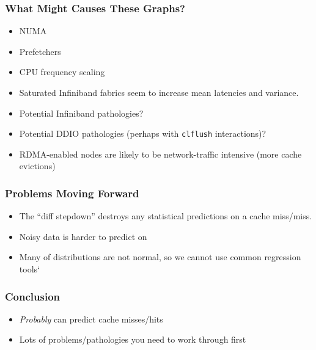 \documentclass{beamer}
\begin{document}
\begin{frame}
 \frametitle{What Might Causes These Graphs?}
 \begin{itemize}
  \item NUMA
  \item Prefetchers
  \item CPU frequency scaling
  \item Saturated Infiniband fabrics seem to increase mean latencies and variance.
  \item Potential Infiniband pathologies?
  \item Potential DDIO pathologies (perhaps with \texttt{clflush} interactions)?
  \item RDMA-enabled nodes are likely to be network-traffic intensive (more cache evictions)
 \end{itemize}
\end{frame}

\begin{frame}
 \frametitle{Problems Moving Forward}
 \begin{itemize}
  \item The ``diff stepdown'' destroys any statistical predictions on a cache miss/miss.
  \item Noisy data is harder to predict on
  \item Many of distributions are not normal, so we cannot use common regression tools`
 \end{itemize}
\end{frame}


\begin{frame}
 \frametitle{Conclusion}
 \begin{itemize}
  \item \textit{Probably} can predict cache misses/hits
  \item Lots of problems/pathologies you need to work through first
 \end{itemize}

\end{frame}
\end{document}
